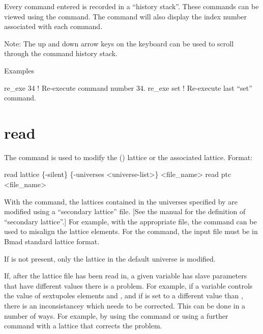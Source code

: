 \vskip 10pt 

Every \tao command entered is recorded in a ``history stack''. These commands can be
viewed using the  command. The  command will also display the
index number associated with each command.

Note: The up and down arrow keys on the keyboard can be used to scroll through the command history
stack.

Examples
\begin{example}
  re_exe 34   ! Re-execute command number 34.
  re_exe set  ! Re-execute last ``set'' command.  
\end{example}

\section{read}
\label{s:read}

The  command is used to modify the (\bmad)  lattice or the associated
 lattice. Format:
\begin{example}
  read lattice \{-silent\} \{-universes <universe-list>\} <file_name>
  read ptc <file_name>
\end{example}

\vskip 10pt 

With the  command, the  lattices contained in the universes specified by
 are modified using a ``secondary lattice'' file.  [See the \bmad manual for the
definition of ``secondary lattice''.] For example, with the appropriate file, the  command
can be used to misalign the lattice elements. For the  command, the input file must
be in Bmad standard lattice format.

If  is not present, only the  lattice
in the default universe is modified.

If, after the lattice file has been read in, a given \tao variable has slave parameters that have
different values there is a problem. For example, if a \tao variable controls the  value of
sextupoles elements  and , and if  is set to a different value than ,
there is an inconsistancey which needs to be corrected. This can be done in a number of ways. For
example, by using the  command or using a further  command with
a lattice that corrects the problem.

